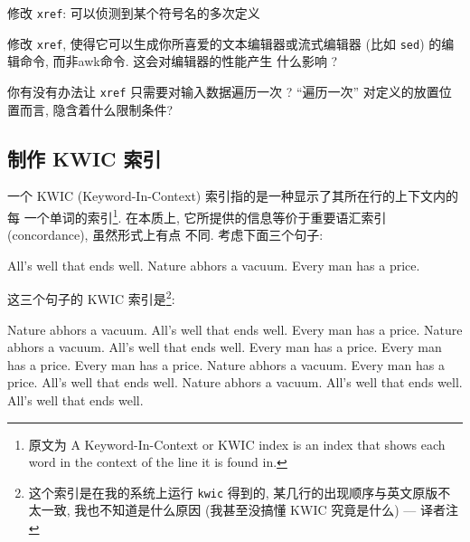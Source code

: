 \begin{exercise}
    \label{exer:xref}
    修改 \texttt{xref}: 可以侦测到某个符号名的多次定义
\end{exercise}

\begin{exercise}
    修改 \texttt{xref}, 使得它可以生成你所喜爱的文本编辑器或流式编辑器
    (比如 \texttt{sed}) 的编辑命令, 而非awk命令. 这会对编辑器的性能产生
    什么影响 ?
\end{exercise}

\begin{exercise}
    \label{exer:xref_once}
    你有没有办法让 \texttt{xref} 只需要对输入数据遍历一次 ? ``遍历一次''
    对定义的放置位置而言, 隐含着什么限制条件?
\end{exercise}

\subsection{制作 KWIC 索引}
\label{subsec:making_a_kwic_index}

一个 KWIC (Keyword-In-Context) 索引指的是一种显示了其所在行的上下文内的每
一个单词的索引\footnote{原文为 A Keyword-In-Context or KWIC index is an
index that shows each word in the context of the line it is found in.}.
在本质上, 它所提供的信息等价于重要语汇索引 (concordance), 虽然形式上有点
不同. 考虑下面三个句子:
\begin{awkcode}
    All's well that ends well.
    Nature abhors a vacuum.
    Every man has a price.
\end{awkcode}
这三个句子的 KWIC 索引是\footnote{这个索引是在我的系统上运行
    \texttt{kwic} 得到的, 某几行的出现顺序与英文原版不太一致,
我也不知道是什么原因 (我甚至没搞懂 KWIC 究竟是什么) --- 译者注}:
\begin{awkcode}
                        Nature  abhors a vacuum.
                                All's well that ends well.
                 Every man has  a price.
                 Nature abhors  a vacuum.
               All's well that  ends well.
                                Every man has a price.
                     Every man  has a price.
                         Every  man has a price.
                                Nature abhors a vacuum.
               Every man has a  price.
                    All's well  that ends well.
               Nature abhors a  vacuum.
          All's well that ends  well.
                         All's  well that ends well.
\end{awkcode}

